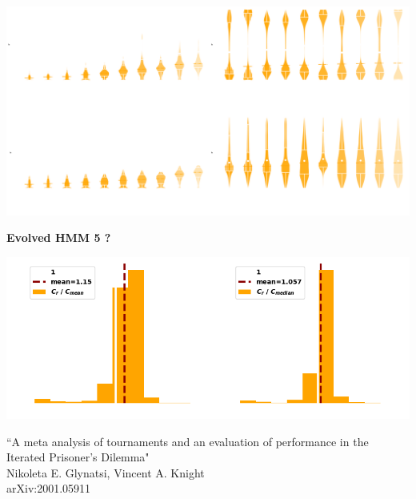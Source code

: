 \documentclass{beamer}
\begin{document}
\begin{frame}
    \begin{center}
        \includegraphics[width=\textwidth]{static/performances.png}
    \end{center}
\end{frame}

\begin{frame}
    \begin{center}
    \Large{\textbf{Evolved HMM 5 ?}}
    \end{center}
\end{frame}

\begin{frame}
    \begin{center}
        \includegraphics[width=.8\textwidth]{static/features.png}
    \end{center}
\end{frame}


\begin{frame}
    \begin{center}
        \large{``A meta analysis of tournaments and an evaluation of performance in the Iterated Prisoner's Dilemma"} \\ \vspace{.5cm}
        \footnotesize{Nikoleta E. Glynatsi, Vincent A. Knight} \\ \vspace{.5cm}
        \footnotesize{arXiv:2001.05911}
    \end{center}
\end{frame}
\end{document}
